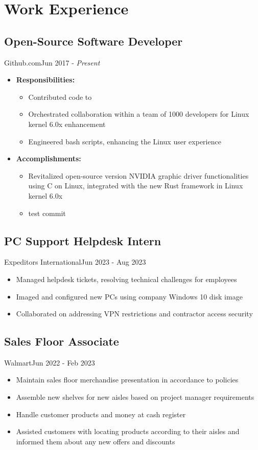 \section{Work Experience}
\subsection{Open-Source Software Developer}{Github.com}{Jun 2017 - \textit{Present}}
\begin{itemize}
    \item \textbf{Responsibilities:}
  \begin{itemize}
  \item Contributed code to   
  \item Orchestrated collaboration within a team of 1000 developers for Linux kernel 6.0x enhancement
  \item Engineered bash scripts, enhancing the Linux user experience
  \end{itemize}
  \item{\textbf{Accomplishments:}}
  \begin{itemize}
  \item Revitalized open-source version NVIDIA graphic driver functionalities using C on Linux, integrated with the new Rust framework in Linux kernel 6.0x
  \item test commit 
  \end{itemize}
\end{itemize}
\subsection{PC Support Helpdesk Intern}{Expeditors International}{Jun 2023 - Aug 2023}
\begin{itemize}
    \item Managed helpdesk tickets, resolving technical challenges for employees
    \item Imaged and configured new PCs using company Windows 10 disk image
    \item Collaborated on addressing VPN restrictions and contractor access security
\end{itemize}
\subsection{Sales Floor Associate}{Walmart}{Jun 2022 - Feb 2023}
\begin{itemize}
    \item Maintain sales floor merchandise presentation in accordance to policies
    \item Assemble new shelves for new aisles based on project manager requirements
    \item Handle customer products and money at cash register
    \item Assisted customers with locating products according to their aisles and informed them about any new offers and discounts 
\end{itemize}
